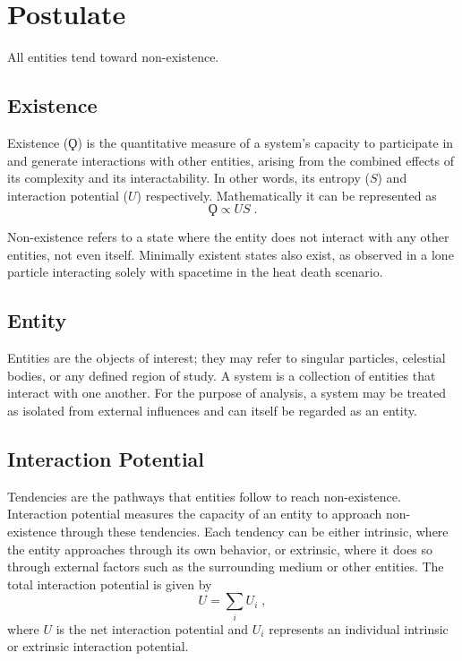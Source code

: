 \documentclass{article}
\begin{document}
\newpage
\section{Postulate}


\vspace{0.4cm}
\begin{center}
All entities tend toward non-existence.
\end{center}


\subsection{Existence}

Existence ($\Koppa$) is the quantitative measure of a system’s capacity to participate in and generate interactions with other entities, arising from the combined effects of its complexity and its interactability. 
In other words, its entropy ($S$) and interaction potential ($U$) respectively. 
Mathematically it can be represented as
\[
    \Koppa \propto US\;.
\]

Non-existence refers to a state where the entity does not interact with any other entities, not even itself. Minimally existent states also exist, as observed in a lone particle interacting solely with spacetime in the heat death scenario.


\subsection{Entity}

Entities are the objects of interest; they may refer to singular particles, celestial bodies, or any defined region of study. 
A system is a collection of entities that interact with one another. 
For the purpose of analysis, a system may be treated as isolated from external influences and can itself be regarded as an entity.


\subsection{Interaction Potential}

Tendencies are the pathways that entities follow to reach non-existence. 
Interaction potential measures the capacity of an entity to approach non-existence through these tendencies. 
Each tendency can be either intrinsic, where the entity approaches through its own behavior, or extrinsic, where it does so through external factors such as the surrounding medium or other entities.
The total interaction potential is given by
\[
    U = \sum_i U_i\;,
\]
where $U$ is the net interaction potential and $U_i$ represents an individual intrinsic or extrinsic interaction potential. 
\end{document}

